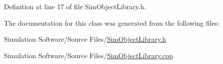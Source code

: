 Definition at line 17 of file Sim\+Object\+Library.\+h.



The documentation for this class was generated from the following files\+:\begin{DoxyCompactItemize}
\item 
Simulation Software/\+Source Files/\hyperlink{_sim_object_library_8h}{Sim\+Object\+Library.\+h}\item 
Simulation Software/\+Source Files/\hyperlink{_sim_object_library_8cpp}{Sim\+Object\+Library.\+cpp}\end{DoxyCompactItemize}
